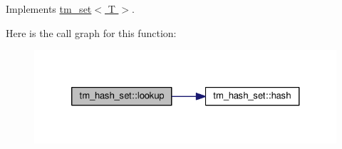 Implements \hyperlink{classtm__set_a64e229588adaaf5108b9db56a1fcf55f}{tm\-\_\-set$<$ T $>$}.



Here is the call graph for this function\-:
\nopagebreak
\begin{figure}[H]
\begin{center}
\leavevmode
\includegraphics[width=324pt]{classtm__hash__set_a8951d8abc33cec22051de7168a84ee3e_cgraph}
\end{center}
\end{figure}


